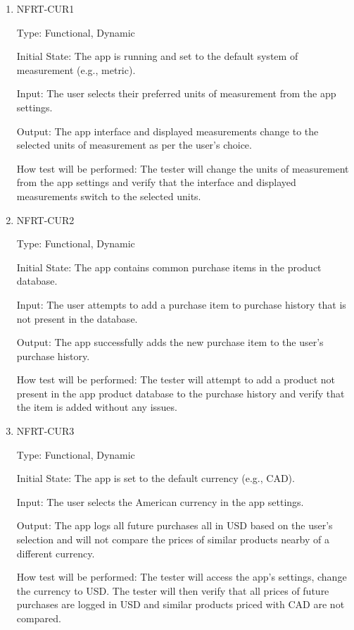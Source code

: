 \documentclass[12pt, titlepage]{article}
\begin{document}
\begin{enumerate}

\item{NFRT-CUR1\\}

Type: Functional, Dynamic
					
Initial State: The app is running and set to the default system of measurement (e.g., metric).
					
Input: The user selects their preferred units of measurement from the app settings.
					
Output: The app interface and displayed measurements change to the selected units of measurement as per the user's choice.
					
How test will be performed: The tester will change the units of measurement from the app settings and verify that the interface and displayed measurements switch to the selected units.
					
\item{NFRT-CUR2\\}

Type: Functional, Dynamic
					
Initial State: The app contains common purchase items in the product database.
					
Input: The user attempts to add a purchase item to purchase history that is not present in the database.
					
Output: The app successfully adds the new purchase item to the user's purchase history.
					
How test will be performed: The tester will attempt to add a product not present in the app product database to the purchase history and verify that the item is added without any issues.

\item{NFRT-CUR3\\}

Type: Functional, Dynamic
					
Initial State: The app is set to the default currency (e.g., CAD).
					
Input: The user selects the American currency in the app settings.
					
Output: The app logs all future purchases all in USD based on the user's selection and will not compare the prices of similar products nearby of a different currency.
					
How test will be performed: The tester will access the app's settings, change the currency to USD. The tester will then verify that all prices of future purchases are logged in USD and similar products priced with CAD are not compared.

\end{enumerate}
\end{document}
